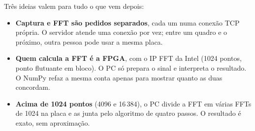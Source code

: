 \documentclass[11pt,a4paper,oneside]{article}
\begin{document}
Três ideias valem para tudo o que vem depois:

\begin{itemize}
\item \textbf{Captura e FFT são pedidos separados}, cada um numa conexão TCP
  própria. O servidor atende uma conexão por vez; entre um quadro e o próximo,
  outra pessoa pode usar a mesma placa.
\item \textbf{Quem calcula a FFT é a FPGA}, com o IP FFT da Intel (1024 pontos,
  ponto flutuante em bloco). O PC só prepara o sinal e interpreta o resultado.
  O NumPy refaz a mesma conta apenas para mostrar quanto as duas concordam.
\item \textbf{Acima de 1024 pontos} (4096 e 16\,384), o PC divide a FFT em
  várias FFTs de 1024 na placa e as junta pelo algoritmo de quatro passos. O
  resultado é exato, sem aproximação.
\end{itemize}
\end{document}
